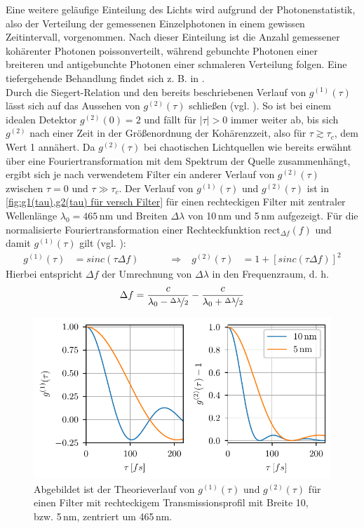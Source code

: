 Eine weitere geläufige Einteilung des Lichts wird aufgrund der Photonenstatistik, also der Verteilung der gemessenen Einzelphotonen in einem gewissen Zeitintervall, vorgenommen. 
Nach dieser Einteilung ist die Anzahl gemessener kohärenter Photonen poissonverteilt, während gebunchte Photonen einer breiteren und antigebunchte Photonen einer schmaleren Verteilung folgen. 
Eine tiefergehende Behandlung findet sich z. B. in \cite[Kap. 5.4-5.6]{foxQuantumOpticsIntroduction2006}. \\

Durch die Siegert-Relation und den bereits beschriebenen Verlauf von $g^{(1)}(\tau)$ lässt sich auf das Aussehen von $g^{(2)}(\tau)$ schließen (vgl. \cite[Kap. 6.3]{foxQuantumOpticsIntroduction2006}). 
So ist bei einem idealen Detektor $g^{(2)}(0)=2$ und fällt für $|\tau|>0$ immer weiter ab, bis sich $g^{(2)}$ nach einer Zeit in der Größenordnung der Kohärenzzeit, also für $\tau\gtrsim\tau_c$, dem Wert 1 annähert. 
Da $g^{(2)}(\tau)$ bei chaotischen Lichtquellen wie bereits erwähnt über eine Fouriertransformation mit dem Spektrum der Quelle zusammenhängt, ergibt sich je nach verwendetem Filter ein anderer Verlauf von $g^{(2)}(\tau)$ zwischen $\tau=0$ und $\tau \gg \tau_c$. 
Der Verlauf von $g^{(1)}(\tau)$ und $g^{(2)}(\tau)$ ist in \autoref{fig:g1(tau),g2(tau) für versch Filter} für einen rechteckigen Filter mit zentraler Wellenlänge $\lambda_0 = 465\,\mathrm{nm}$ und Breiten $\Delta\lambda$ von 10\,nm und 5\,nm aufgezeigt. 
Für die normalisierte Fouriertransformation einer Rechteckfunktion $\mathrm{rect}_{\Delta f}\left(f\right)$ und damit $g^{(1)}(\tau)$ gilt (vgl. \cite[Kap. 3.2]{wangIntroductionOrthogonalTransforms2012}):
\begin{align}
    g^{(1)}(\tau) &= sinc\left(\tau\Delta f\right) \quad\quad\quad \Rightarrow& g^{(2)}(\tau) &= 1+ \left[sinc\left(\tau\Delta f\right)\right]^2
\end{align}
Hierbei entspricht $\Delta f$ der Umrechnung von $\Delta\lambda$ in den Frequenzraum, d. h. 
\begin{equation}
    \Delta f = \frac{c}{\lambda_0 - \nicefrac{\Delta\lambda}{2}} - \frac{c}{\lambda_0 + \nicefrac{\Delta\lambda}{2}}
\end{equation}
\begin{figure}[h]
    \centering
    \includegraphics{images/Theorie/g1_g2_tau.pdf}
    \caption{Abgebildet ist der Theorieverlauf von $g^{(1)}(\tau)$ und $g^{(2)}(\tau)$ für einen Filter mit rechteckigem Transmissionsprofil mit Breite 10, bzw. 5\,nm, zentriert um 465\,nm.}
    \label{fig:g1(tau),g2(tau) für versch Filter}
\end{figure}
